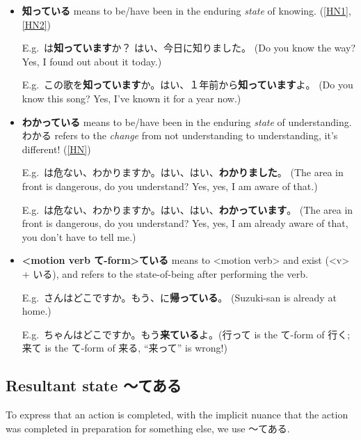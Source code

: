\documentclass[../nihongo-gakushuu-kyouzai.tex]{subfiles}
\begin{document}
\begin{itemize}
    \item \textbf{知っている} means to be/have been in the enduring \emph{state} of knowing.  (\href{https://ja.hinative.com/questions/258648}{[HN1]}, \href{https://ja.hinative.com/questions/10745394}{[HN2]})

    E.g.\ は\textbf{知っています}か？ はい、今日に知りました。 (Do you know the way? Yes, I found out about it today.)

    E.g.\ この歌を\textbf{知っています}か。はい、１年前から\textbf{知っています}よ。 (Do you know this song? Yes, I've known it for a year now.)

    \item \textbf{わかっている} means to be/have been in the enduring \emph{state} of understanding. わかる refers to the \emph{change} from not understanding to understanding, it's different! (\href{https://ja.hinative.com/questions/355185}{[HN]})

    E.g.\ は危ない、わかりますか。はい、はい、\textbf{わかりました}。 (The area in front is dangerous, do you understand? Yes, yes, I am aware of that.)

    E.g.\ は危ない、わかりますか。はい、はい、\textbf{わかっています}。 (The area in front is dangerous, do you understand? Yes, yes, I am already aware of that, you don't have to tell me.)

    \item \textbf{<motion verb て-form>ている} means to <motion verb> and exist (<v> + いる), and refers to the state-of-being after performing the verb.

    E.g.\ さんはどこですか。もう、に\textbf{帰っている}。 (Suzuki-san is already at home.)

    E.g.\ ちゃんはどこですか。もう\textbf{来ている}よ。(行って is the て-form of 行く; 来て is the て-form of 来る, ``来って'' is wrong!)
\end{itemize}


\subsection{Resultant state 〜てある} \label{sec:resultant-state-tearu}
To express that an action is completed, with the implicit nuance that the action was completed in preparation for something else, we use 〜てある.
\end{document}
